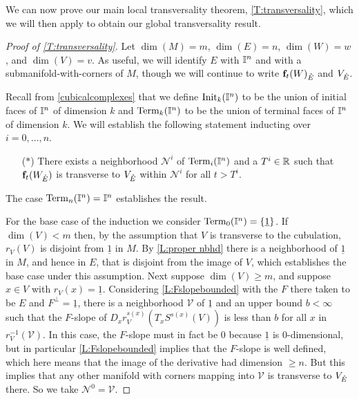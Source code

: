 

We can now prove our main local transversality theorem, \cref{T:transversality}, which we will then apply to obtain our global transversality result.



\begin{proof}[Proof of \cref{T:transversality}]
	Let $\dim(M) = m$, $\dim(E) = n$, $\dim(W) = w$, and $\dim(V) = v$.
	As useful, we will identify $E$ with $\mathbb{I}^n$ and with a submanifold-with-corners of $M$, though we will continue to write $\mathbf{f}_t(W)_{\mathring{E}}$ and $V_{\mathring{E}}$.

	Recall from \cref{cubicalcomplexes} that we define ${\rm Init}_k(\mathbb{I}^n)$ to be the union of initial faces of $\mathbb{I}^n$ of dimension $k$ and ${\rm Term}_k(\mathbb{I}^n)$ to be the union of terminal faces of $\mathbb{I}^n$ of dimension $k$.
	We will establish the following statement inducting over $i = 0, \dots, n$.
	\begin{itemize}
		\item[($\ast$)] There exists a neighborhood $\mathcal N^i$ of ${\rm Term}_{i}(\mathbb{I}^n)$ and a $T^i \in \mathbb{R}$ such that $\mathbf{f}_t(W_{\mathring{E}})$ is transverse to $V_{\mathring{E}}$ within $\mathcal N^i$ for all $t > T^i$.
	\end{itemize}
	The case $ {\rm Term}_{n}(\mathbb{I}^n) = \mathbb{I}^n$ establishes the result.

	For the base case of the induction we consider ${\rm Term}_0(\mathbb{I}^n) = \{\underline{1}\}$.
	If $\dim(V) < m$ then, by the assumption that $V$ is transverse to the cubulation, $r_V(V)$ is disjoint from $\underline{1}$ in $M$.
	By \cref{L:proper nbhd} there is a neighborhood of $\underline{1}$ in $M$, and hence in $E$, that is disjoint from the image of $V$, which establishes the base case under this assumption.
	Next suppose $\dim(V) \geq m$, and suppose $x \in V$ with $r_V(x) = \underline{1}$.
	Considering \cref{L:Fslopebounded} with the $F$ there taken to be $E$ and $F^\perp = \underline{1}$, there is a neighborhood $\mathcal{V}$ of $\underline{1}$ and an upper bound $b < \infty$ such that
	the $F$-slope of $D_xr^{s(x)}_V(T_xS^{s(x)}(V))$ is less than $b$ for all $x$ in $r_V^{-1}(\mathcal{V})$.
	In this case, the $F$-slope must in fact be $0$ because $\underline{1}$ is $0$-dimensional, but in particular \cref{L:Fslopebounded} implies that the $F$-slope is well defined, which here means that the image of the derivative had dimension $\geq n$.
	But this implies that any other manifold with corners mapping into $\mathcal V$ is transverse to $V_{\mathring{E}}$ there.
	So we take $\mathcal N^0 = \mathcal V$.


\end{proof}
